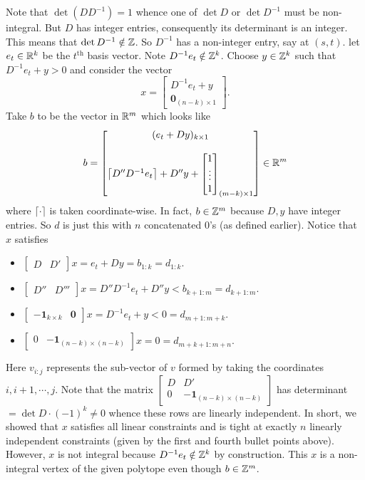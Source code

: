 Note that $\det (DD^{-1})=1$ whence one of $\det D$ or $\det D^{-1}$ must be non-integral. But $D$ has integer entries, consequently its determinant is an integer. This means that $\det D^{-1}\notin \mathbb{Z}$. So $D^{-1}$ has a non-integer entry, say at $(s,t)$. let $e_{t}\in\mathbb{R}^{k}$ be the $t^{\text{th}}$ basis vector. Note $D^{-1}e_{t}\notin \mathbb{Z}^{k}$. Choose $y\in \mathbb{Z}^{k}$ such that $D^{-1}e_{t}+y > 0$ and consider the vector $$x = \begin{bmatrix}D^{-1}e_{t}+y\\ \pmb 0_{(n-k)\times 1}\end{bmatrix}.$$  Take $b$ to be the vector in $\mathbb{R}^{m}$ which looks like $$b = \begin{bmatrix}(e_{t}+Dy)_{k\times 1}\\\\ \left\lceil D''D^{-1}e_{t}\right\rceil+D''y +\begin{bmatrix}1\\\vdots\\1\end{bmatrix}_{(m-k)\times 1}\end{bmatrix}\in\mathbb{R}^{m}$$ where $\lceil\cdot\rceil$ is taken coordinate-wise. In fact, $b\in\mathbb{Z}^{m}$ because $D,y$ have integer entries. So $d$ is just this with $n$ concatenated $0$'s (as defined earlier). Notice that $x$ satisfies 
\begin{itemize}
\item $\begin{bmatrix}D&D'\end{bmatrix}x = e_{t}+Dy = b_{1:k} = d_{1:k}$.
\item $\begin{bmatrix}D''&D'''\end{bmatrix}x = D''D^{-1}e_{t}+D''y < b_{k+1:m} = d_{k+1:m}$.
\item $\begin{bmatrix}-\pmb 1_{k\times k}&\pmb 0\end{bmatrix}x = D^{-1}e_{t} + y < 0 = d_{m+1:m+k}$.
\item $\begin{bmatrix}0 & -\pmb 1_{(n-k)\times (n-k)}\end{bmatrix}x = 0 = d_{m+k+1:m+n}$. 
\end{itemize}
Here $v_{i:j}$ represents the sub-vector of $v$ formed by taking the coordinates $i,i+1,\cdots,j$. Note that the matrix $\begin{bmatrix}D&D'\\0&-\pmb 1_{(n-k)\times (n-k)}\end{bmatrix}$ has determinant $=\det D \cdot (-1)^{k}\ne 0$ whence these rows are linearly independent. In short, we showed that $x$ satisfies all linear constraints and is tight at exactly $n$ linearly independent constraints (given by the first and fourth bullet points above). However, $x$ is not integral because $D^{-1}e_{t}\notin\mathbb{Z}^{k}$ by construction. This $x$ is a non-integral vertex of the given polytope even though $b\in\mathbb{Z}^{m}$.



